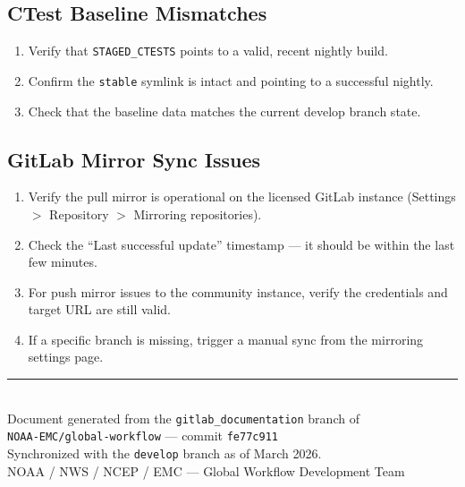\documentclass[11pt,letterpaper,twoside]{article}
\begin{document}
\subsection{CTest Baseline Mismatches}

\begin{enumerate}[leftmargin=1.5em]
  \item Verify that \texttt{STAGED\_CTESTS} points to a valid, recent nightly build.
  \item Confirm the \texttt{stable} symlink is intact and pointing to a
    successful nightly.
  \item Check that the baseline data matches the current develop branch state.
\end{enumerate}

\subsection{GitLab Mirror Sync Issues}

\begin{enumerate}[leftmargin=1.5em]
  \item Verify the pull mirror is operational on the licensed GitLab instance
    (Settings $>$ Repository $>$ Mirroring repositories).
  \item Check the ``Last successful update'' timestamp --- it should be within the
    last few minutes.
  \item For push mirror issues to the community instance, verify the credentials
    and target URL are still valid.
  \item If a specific branch is missing, trigger a manual sync from the
    mirroring settings page.
\end{enumerate}


\vfill
\begin{center}
\rule{0.6\linewidth}{0.5pt}\\[6pt]
{\small\color{heragray}
  Document generated from the \texttt{gitlab\_documentation} branch of\\
  \texttt{NOAA-EMC/global-workflow} --- commit \texttt{fe77c911}\\[2pt]
  Synchronized with the \texttt{develop} branch as of March 2026.\\[4pt]
  NOAA / NWS / NCEP / EMC --- Global Workflow Development Team
}
\end{center}
\end{document}
